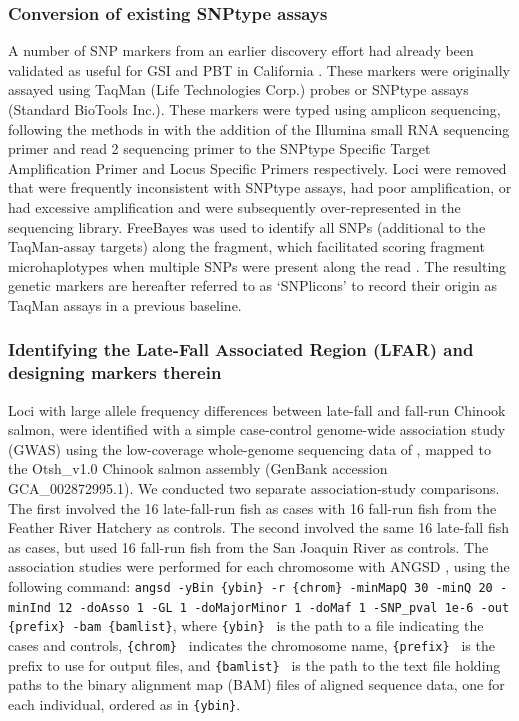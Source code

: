 \subsubsection*{Conversion of existing SNPtype assays}

A number of SNP markers from an earlier discovery effort \citep{clemento2011discovery} had already
been validated as useful for GSI
and PBT in California \citep{clemento2014evaluation}. These markers were originally assayed
using TaqMan (Life Technologies Corp.) probes or SNPtype assays (Standard BioTools Inc.).
These markers were typed using amplicon sequencing, following the methods in
\citet{campbell2015genotyping} with the addition of the Illumina small RNA sequencing primer and
read 2 sequencing primer to the SNPtype Specific Target Amplification Primer and Locus
Specific Primers respectively.  Loci were removed that were frequently inconsistent with SNPtype assays,
had poor amplification, or had excessive amplification and were subsequently over-represented in the sequencing library.  FreeBayes was used to identify all SNPs (additional to the TaqMan-assay targets) along the fragment, which facilitated scoring fragment microhaplotypes when multiple SNPs were present along the read \citep{baetscher2018microhaplotypes}. The resulting genetic markers are hereafter referred to as `SNPlicons' to record their origin as TaqMan assays in a previous
baseline.


\subsubsection*{Identifying the Late-Fall Associated Region (LFAR) and designing markers therein}

Loci with large allele frequency differences between late-fall and fall-run Chinook salmon,
were identified with a simple case-control genome-wide association study (GWAS) using the low-coverage whole-genome sequencing
data of \citet{thompson2020complex}, mapped to the Otsh\_v1.0 Chinook salmon assembly
(GenBank accession GCA\_002872995.1).  We conducted
two separate association-study comparisons.
The first involved the 16 late-fall-run fish as cases with 16 fall-run fish from the Feather River Hatchery as controls.
The second involved the same 16 late-fall fish as cases, but used 16 fall-run fish from the San
Joaquin River as controls.  The association studies were performed for each chromosome with
ANGSD \citep{pmid21663684,korneliussen_angsd_2014}, using the following command: {\footnotesize\tt angsd -yBin \{ybin\}  -r \{chrom\}
-minMapQ 30 -minQ 20 -minInd 12 -doAsso 1 -GL 1 -doMajorMinor 1 -doMaf 1 -SNP\_pval 1e-6
-out \{prefix\}  -bam \{bamlist\}}, where {\tt \{ybin\} } is the path to a file indicating the cases and
controls,
{\tt \{chrom\} } indicates the chromosome name, {\tt \{prefix\} } is the prefix to use for output files, and
{\tt \{bamlist\} } is the path to the text file holding paths to the binary alignment map (BAM) files
of aligned sequence data, one for each individual, ordered as in {\tt \{ybin\}}.

